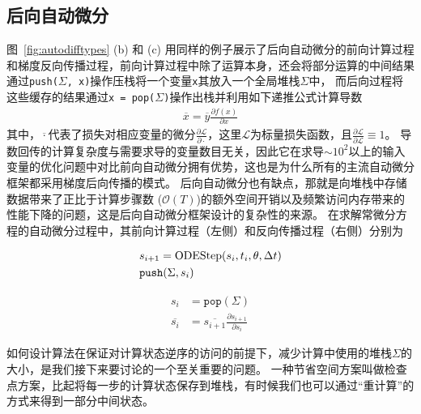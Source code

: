 \documentclass[A4,twoside,fontset=ubuntu,UTF8]{ctexart}
\begin{document}
\subsection{后向自动微分}
图~\ref{fig:autodifftypes} (b) 和 (c) 用同样的例子展示了后向自动微分的前向计算过程和梯度反向传播过程，前向计算过程中除了运算本身，还会将部分运算的中间结果通过\texttt{push($\Sigma$, x)}操作压栈将一个变量\texttt{x}其放入一个全局堆栈$\Sigma$中，
而后向过程将这些缓存的结果通过\texttt{x = pop($\Sigma$)}操作出栈并利用如下递推公式计算导数
\begin{align}
    \overline{x} = \overline{y}\frac{\partial f(x)}{\partial x}
\end{align}
其中，$\overline{\cdot}$代表了损失对相应变量的微分$\frac{\partial \mathcal{L}}{\partial \cdot}$，这里$\mathcal{L}$为标量损失函数，且$\frac{\partial \mathcal L}{\partial \mathcal L}\equiv 1$。
导数回传的计算复杂度与需要求导的变量数目无关，因此它在求导$\sim 10^2$以上的输入变量的优化问题中对比前向自动微分拥有优势，这也是为什么所有的主流自动微分框架都采用梯度后向传播的模式。
后向自动微分也有缺点，那就是向堆栈中存储数据带来了正比于计算步骤数 ($\mathcal{O}(T)$)的额外空间开销以及频繁访问内存带来的性能下降的问题，这是后向自动微分框架设计的复杂性的来源。
在求解常微分方程的自动微分过程中，其前向计算过程（左侧）和反向传播过程（右侧）分别为

\begin{minipage}{0.45\textwidth}
\begin{align*}
    &s_{i+1} = {\rm ODEStep}(s_{i}, t_i, \theta, \Delta t)\\
    &\texttt{push}(\Sigma, s_{i})
\end{align*}
\end{minipage}
\begin{minipage}{0.45\textwidth}
\begin{align*}
    s_{i} &= \texttt{pop}(\Sigma)\\
    \overline{s_i} &= \overline{s_{i+1}}\frac{\partial s_{i+1}}{\partial s_{i}}
\end{align*}
\end{minipage}

如何设计算法在保证对计算状态逆序的访问的前提下，减少计算中使用的堆栈$\Sigma$的大小，是我们接下来要讨论的一个至关重要的问题。
一种节省空间方案叫做检查点方案，比起将每一步的计算状态保存到堆栈，有时候我们也可以通过“重计算”的方式来得到一部分中间状态。
\end{document}
